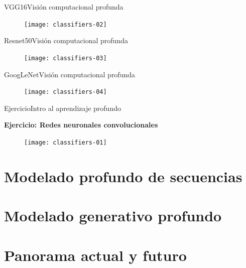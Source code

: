 \documentclass[10pt,border=3pt,tikz]{beamer}
\begin{document}
    \begin{frame}{VGG16}{Visión computacional profunda}
        \begin{figure}
            \centering
            \texttt{[image: classifiers-02]}
        \end{figure}
    \end{frame}
    
    \begin{frame}{Resnet50}{Visión computacional profunda}
        \begin{figure}
            \centering
            \texttt{[image: classifiers-03]}
        \end{figure}
    \end{frame}
    
    \begin{frame}{GoogLeNet}{Visión computacional profunda}
        \begin{figure}
            \centering
            \texttt{[image: classifiers-04]}
        \end{figure}
    \end{frame}
    
    \begin{frame}{Ejercicio}{Intro al aprendizaje profundo}
        \begin{center}
            {\Large \textbf{Ejercicio: Redes neuronales convolucionales}}
        \end{center}
        \begin{figure}
            \centering
            \texttt{[image: classifiers-01]}
        \end{figure}
    \end{frame}
    
    
    \section{Modelado profundo de secuencias}
    \section{Modelado generativo profundo}
    \section{Panorama actual y futuro}
    
\end{document}
